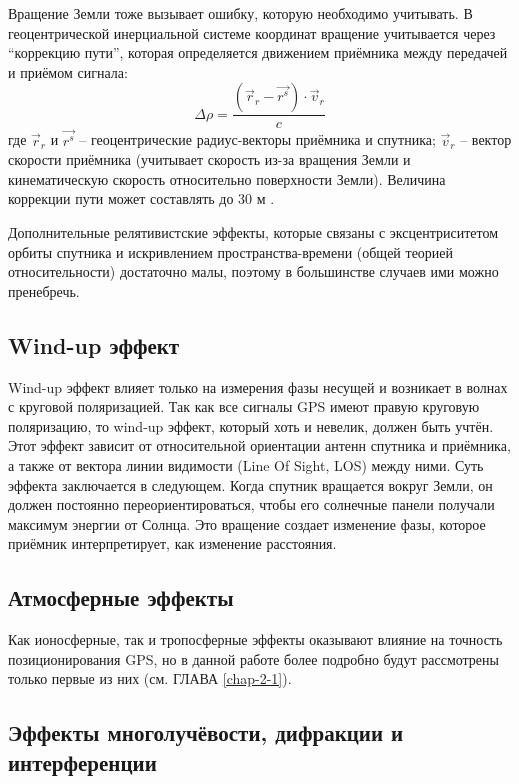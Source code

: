Вращение Земли тоже вызывает ошибку, которую необходимо учитывать. 
В геоцентрической инерциальной системе координат вращение учитывается через ``коррекцию пути'', которая определяется движением приёмника между передачей и приёмом сигнала:
\begin{equation}
\Delta\rho=\frac{(\vec{r}_r-\vec{r^s})\cdot\vec{v}_r}{c}    
\end{equation}
где
$\vec{r}_r$ и $\vec{r^s}$ -- геоцентрические радиус-векторы приёмника и спутника;
$\vec{v}_r$ -- вектор скорости приёмника (учитывает скорость из-за вращения Земли и кинематическую скорость относительно поверхности Земли). 
Величина коррекции пути может составлять до 30 м \cite{Hecimovic2013}.  

Дополнительные релятивистские эффекты, которые связаны с эксцентриситетом орбиты спутника и искривлением пространства-времени (общей теорией относительности) достаточно малы, поэтому в большинстве случаев ими можно пренебречь. 

\subsection*{\textbf{Wind-up эффект}}

Wind-up эффект влияет только на измерения фазы несущей и возникает в волнах с круговой поляризацией.
Так как все сигналы GPS имеют правую круговую поляризацию, то wind-up эффект, который хоть и невелик, должен быть учтён. 
Этот эффект зависит от относительной ориентации антенн спутника и приёмника, а также от вектора линии видимости (Line Of Sight, LOS) между ними.
Суть эффекта заключается в следующем.
Когда спутник вращается вокруг Земли, он должен постоянно переориентироваться, чтобы его солнечные панели получали максимум энергии от Солнца.
Это вращение создает изменение фазы, которое приёмник интерпретирует, как изменение расстояния. 

\subsection*{\textbf{Атмосферные эффекты}}

Как ионосферные, так и тропосферные эффекты оказывают влияние на точность позиционирования GPS, но в данной работе более подробно будут рассмотрены только первые из них (см. ГЛАВА \ref{chap-2-1}). 

\subsection*{\textbf{Эффекты многолучёвости, дифракции и интерференции}}

